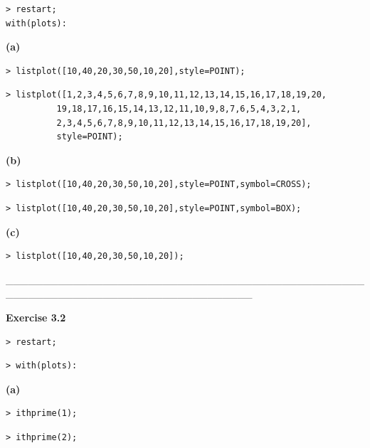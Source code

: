\documentclass{article}
\begin{document}
\begin{lstlisting}
> restart;
with(plots):
\end{lstlisting}
\begin{Maple Normal}
\textbf{(a)}
\end{Maple Normal}
\begin{lstlisting}
> listplot([10,40,20,30,50,10,20],style=POINT);
\end{lstlisting}
\begin{lstlisting}
> listplot([1,2,3,4,5,6,7,8,9,10,11,12,13,14,15,16,17,18,19,20,
          19,18,17,16,15,14,13,12,11,10,9,8,7,6,5,4,3,2,1,
          2,3,4,5,6,7,8,9,10,11,12,13,14,15,16,17,18,19,20],
          style=POINT);
\end{lstlisting}
\begin{Maple Normal}
\textbf{(b)}
\end{Maple Normal}
\begin{lstlisting}
> listplot([10,40,20,30,50,10,20],style=POINT,symbol=CROSS);
\end{lstlisting}
\begin{lstlisting}
> listplot([10,40,20,30,50,10,20],style=POINT,symbol=BOX);
\end{lstlisting}
\begin{Maple Normal}
\textbf{(c)}
\end{Maple Normal}
\begin{lstlisting}
> listplot([10,40,20,30,50,10,20]);
\end{lstlisting}
\begin{Maple Normal}
\_\_\_\_\_\_\_\_\_\_\_\_\_\_\_\_\_\_\_\_\_\_\_\_\_\_\_\_\_\_\_\_\_\_\_\_\_\_\_\_\_\_\_\_\_\_\_\_\_\_\_\_\_\_\_\_\_\_\_\_\_\_\_\_\_\_\_\_\_\_\_\_\_\_\_\_\_\_\_\_\_
\end{Maple Normal}
\begin{Maple Normal}
\textbf{Exercise 3.2}
\end{Maple Normal}
\begin{lstlisting}
> restart;
\end{lstlisting}
\begin{lstlisting}
> with(plots):
\end{lstlisting}
\begin{Maple Normal}
\textbf{(a)}
\end{Maple Normal}
\begin{lstlisting}
> ithprime(1);
\end{lstlisting}
\begin{lstlisting}
> ithprime(2);
\end{lstlisting}
\end{document}
